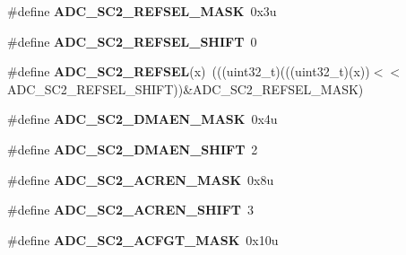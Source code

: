\begin{DoxyCompactItemize}
\item 
\mbox{\label{group___a_d_c___register___masks_gaa821d1e2e4575c757e9446da61b2230a}} 
\#define {\bfseries A\+D\+C\+\_\+\+S\+C2\+\_\+\+R\+E\+F\+S\+E\+L\+\_\+\+M\+A\+SK}~0x3u
\item 
\mbox{\label{group___a_d_c___register___masks_gaab9b293eb54de2d9d246766002e44556}} 
\#define {\bfseries A\+D\+C\+\_\+\+S\+C2\+\_\+\+R\+E\+F\+S\+E\+L\+\_\+\+S\+H\+I\+FT}~0
\item 
\mbox{\label{group___a_d_c___register___masks_gacac3b41d5c2bb74a8c614f200f0c0a36}} 
\#define {\bfseries A\+D\+C\+\_\+\+S\+C2\+\_\+\+R\+E\+F\+S\+EL}(x)~(((uint32\+\_\+t)(((uint32\+\_\+t)(x))$<$$<$A\+D\+C\+\_\+\+S\+C2\+\_\+\+R\+E\+F\+S\+E\+L\+\_\+\+S\+H\+I\+FT))\&A\+D\+C\+\_\+\+S\+C2\+\_\+\+R\+E\+F\+S\+E\+L\+\_\+\+M\+A\+SK)
\item 
\mbox{\label{group___a_d_c___register___masks_ga50fc5fed4844c3ceb8da9b595029da11}} 
\#define {\bfseries A\+D\+C\+\_\+\+S\+C2\+\_\+\+D\+M\+A\+E\+N\+\_\+\+M\+A\+SK}~0x4u
\item 
\mbox{\label{group___a_d_c___register___masks_ga5554f538c0c6d7b3e2dfa502fdfed488}} 
\#define {\bfseries A\+D\+C\+\_\+\+S\+C2\+\_\+\+D\+M\+A\+E\+N\+\_\+\+S\+H\+I\+FT}~2
\item 
\mbox{\label{group___a_d_c___register___masks_ga25f7f0c6a6513cbfbd4684513b373f9c}} 
\#define {\bfseries A\+D\+C\+\_\+\+S\+C2\+\_\+\+A\+C\+R\+E\+N\+\_\+\+M\+A\+SK}~0x8u
\item 
\mbox{\label{group___a_d_c___register___masks_ga34954b7e5cb86e290b281e2f97b63187}} 
\#define {\bfseries A\+D\+C\+\_\+\+S\+C2\+\_\+\+A\+C\+R\+E\+N\+\_\+\+S\+H\+I\+FT}~3
\item 
\mbox{\label{group___a_d_c___register___masks_gaf61a6fdf74bec8c24415e590dc98b572}} 
\#define {\bfseries A\+D\+C\+\_\+\+S\+C2\+\_\+\+A\+C\+F\+G\+T\+\_\+\+M\+A\+SK}~0x10u
\item 
\mbox{\label{group___a_d_c___register___masks_gaa27da559ff9959f248db75fbb95dae6b}} 
$$
\end{DoxyCompactItemize}
